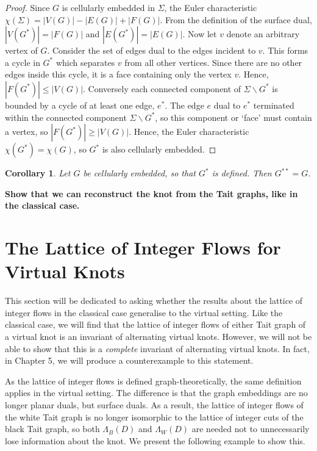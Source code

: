 \documentclass[12pt]{report}
\newcommand{\notered}[1]{{\color{Red} \textbf{#1}}}
\newtheorem*{corollary}{Corollary}
\begin{document}
\begin{proof}
Since $G$ is cellularly embedded in $\Sigma$, the Euler characteristic $\chi(\Sigma) = |V(G)| - |E(G)| + |F(G)|$. From the definition of the surface dual, $|V(G^{*})| = |F(G)|$ and $|E(G^{*})| = |E(G)|$. Now let $v$ denote an arbitrary vertex of $G$. Consider the set of edges dual to the edges incident to $v$. This forms a cycle in $G^{*}$ which separates $v$ from all other vertices. Since there are no other edges inside this cycle, it is a face containing only the vertex $v$. Hence, $|F(G^{*})| \leq |V(G)|$. Conversely each connected component of $\Sigma \smallsetminus G^{*}$ is bounded by a cycle of at least one edge, $e^{*}$. The edge $e$ dual to $e^{*}$ terminated within the connected component $\Sigma \smallsetminus G^{*}$, so this component or `face' must contain a vertex, so $|F(G^{*})| \geq |V(G)|$. Hence, the Euler characteristic $\chi(G^{*}) = \chi(G)$, so $G^{*}$ is also cellularly embedded.
\end{proof}

\begin{corollary}
Let $G$ be cellularly embedded, so that $G^{*}$ is defined. Then $G^{**} = G$.
\end{corollary}

\notered{Show that we can reconstruct the knot from the Tait graphs, like in the classical case.}

\section{The Lattice of Integer Flows for Virtual Knots}

This section will be dedicated to asking whether the results about the lattice of integer flows in the classical case generalise to the virtual setting. Like the classical case, we will find that the lattice of integer flows of either Tait graph of a virtual knot is an invariant of alternating virtual knots. However, we will not be able to show that this is a \textit{complete} invariant of alternating virtual knots. In fact, in Chapter 5, we will produce a counterexample to this statement.

As the lattice of integer flows is defined graph-theoretically, the same definition applies in the virtual setting. The difference is that the graph embeddings are no longer planar duals, but surface duals. As a result, the lattice of integer flows of the white Tait graph is no longer isomorphic to the lattice of integer cuts of the black Tait graph, so both $\Lambda_{B}(D)$ and $\Lambda_{W}(D)$ are needed not to unnecessarily lose information about the knot. We present the following example to show this.
\end{document}
